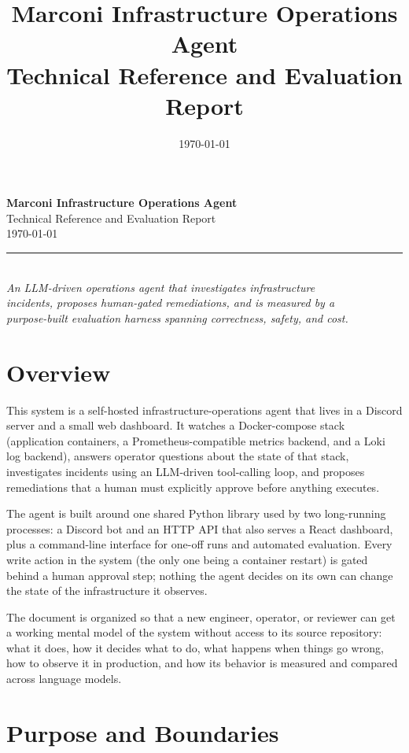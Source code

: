 \documentclass[11pt]{article}
\title{\vspace{-2cm}\textbf{\Huge Marconi Infrastructure Operations Agent}\\[0.6em]
\Large Technical Reference and Evaluation Report}
\author{}
\date{\large \today}
\begin{document}
\begin{titlepage}
\centering
\vspace*{3cm}
{\Huge\bfseries\color{headingblue} Marconi Infrastructure Operations Agent}\\[1em]
{\Large Technical Reference and Evaluation Report}\\[2em]
{\large \today}\\[4em]
\rule{0.6\textwidth}{0.4pt}\\[1.5em]
{\normalsize\itshape An LLM-driven operations agent that investigates infrastructure\\
incidents, proposes human-gated remediations, and is measured by a\\
purpose-built evaluation harness spanning correctness, safety, and cost.}
\vfill
\end{titlepage}

\tableofcontents
\newpage

\section{Overview}

This system is a self-hosted infrastructure-operations agent that lives in a
Discord server and a small web dashboard. It watches a Docker-compose stack
(application containers, a Prometheus-compatible metrics backend, and a Loki
log backend), answers operator questions about the state of that stack,
investigates incidents using an LLM-driven tool-calling loop, and proposes
remediations that a human must explicitly approve before anything executes.

The agent is built around one shared Python library used by two long-running
processes: a Discord bot and an HTTP API that also serves a React
dashboard, plus a command-line interface for one-off runs and automated
evaluation. Every write action in the system (the only one being a container
restart) is gated behind a human approval step; nothing the agent decides on
its own can change the state of the infrastructure it observes.

The document is organized so that a new engineer, operator, or reviewer can
get a working mental model of the system without access to its source
repository: what it does, how it decides what to do, what happens when
things go wrong, how to observe it in production, and how its behavior is
measured and compared across language models.

\section{Purpose and Boundaries}
\end{document}
